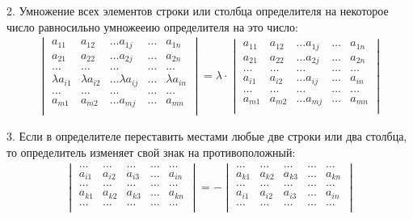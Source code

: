 \documentclass[a4paper,12pt]{extbook}
\theoremstyle{named}
\theoremstyle{named}
\begin{document}
2. Умножение всех элементов строки или столбца определителя на некоторое число \lambda равносильно умножееию определителя на это число:
\begin{gather*}
    \begin{vmatrix}
        a_{11}         & a_{12}         & \dots a_{1j}         & \dots & a_{1n}         \\
        a_{21}         & a_{22}         & \dots a_{2j}         & \dots & a_{2n}         \\
        \dots          & \dots          & \dots                & \dots & \dots          \\
        \lambda a_{i1} & \lambda a_{i2} & \dots \lambda a_{ij} & \dots & \lambda a_{in} \\
        \dots          & \dots          & \dots                & \dots & \dots          \\
        a_{m1}         & a_{m2}         & \dots a_{mj}         & \dots & a_{mn}         \\
    \end{vmatrix}
    =
    \lambda \cdot
    \begin{vmatrix}
        a_{11} & a_{12} & \dots a_{1j} & \dots & a_{1n} \\
        a_{21} & a_{22} & \dots a_{2j} & \dots & a_{2n} \\
        \dots  & \dots  & \dots        & \dots & \dots  \\
        a_{i1} & a_{i2} & \dots a_{ij} & \dots & a_{in} \\
        \dots  & \dots  & \dots        & \dots & \dots  \\
        a_{m1} & a_{m2} & \dots a_{mj} & \dots & a_{mn} \\
    \end{vmatrix}
\end{gather*}

3. Если в определителе переставить местами любые две строки или два столбца, то определитель изменяет свой знак на противоположный:
\begin{gather*}
    \begin{vmatrix}
        \dots  & \dots  & \dots  & \dots & \dots  \\
        a_{i1} & a_{i2} & a_{i3} & \dots & a_{in} \\
        \dots  & \dots  & \dots  & \dots & \dots  \\
        a_{k1} & a_{k2} & a_{k3} & \dots & a_{kn} \\
        \dots  & \dots  & \dots  & \dots & \dots  \\
    \end{vmatrix}
    =
    -
    \begin{vmatrix}
        \dots  & \dots  & \dots  & \dots & \dots  \\
        a_{k1} & a_{k2} & a_{k3} & \dots & a_{kn} \\
        \dots  & \dots  & \dots  & \dots & \dots  \\
        a_{i1} & a_{i2} & a_{i3} & \dots & a_{in} \\
        \dots  & \dots  & \dots  & \dots & \dots  \\
    \end{vmatrix}
\end{gather*}
\end{document}
